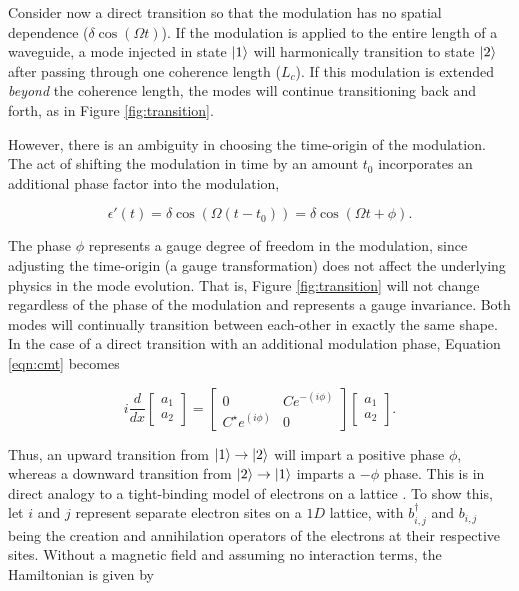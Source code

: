 Consider now a direct transition so that the modulation has no spatial dependence ($\delta \cos (\Omega t)$). If the modulation is applied to the entire length of a waveguide, a mode injected in state $\ket{1}$ will harmonically transition to state $\ket{2}$ after passing through one coherence length ($L_c$). If this modulation is extended \textit{beyond} the coherence length, the modes will continue transitioning back and forth, as in Figure \ref{fig:transition}.

However, there is an ambiguity in choosing the time-origin of the modulation. The act of shifting the modulation in time by an amount $t_0$ incorporates an additional phase factor into the modulation,

\begin{equation}
\epsilon'(t) = \delta \cos (\Omega (t-t_0)) = \delta \cos (\Omega t + \phi).
\label{eqn:gaugemod}
\end{equation}

The phase $\phi$ represents a gauge degree of freedom in the modulation, since adjusting the time-origin (a gauge transformation) does not affect the underlying physics in the mode evolution. That is, Figure \ref{fig:transition} will not change regardless of the phase of the modulation and represents a gauge invariance. Both modes will continually transition between each-other in exactly the same shape. In the case of a direct transition with an additional modulation phase, Equation \ref{eqn:cmt} becomes

\begin{equation}
i \dfrac{d}{dx} \begin{bmatrix}
a_1 \\
a_2
\end{bmatrix}
= 
\begin{bmatrix}
0 &  C e^{-(i \phi)} \\
C^\star e^{(i \phi)} & 0 
\end{bmatrix}
\begin{bmatrix}
a_1 \\
a_2
\end{bmatrix}.
\label{cmt:final}
\end{equation}

Thus, an upward transition from $\ket{1} \rightarrow \ket{2}$ will impart a positive phase $\phi$, whereas a downward transition from $\ket{2} \rightarrow \ket{1}$ imparts a $-\phi$ phase. 
This is in direct analogy to a tight-binding model of electrons on a lattice \cite{Paxton2009}. To show this, let $i$ and $j$ represent separate electron sites on a $1D$ lattice, with $b_{i,j}^\dagger$ and $b_{i,j}$ being the creation and annihilation operators of the electrons at their respective sites. Without a magnetic field and assuming no interaction terms, the Hamiltonian is given by

